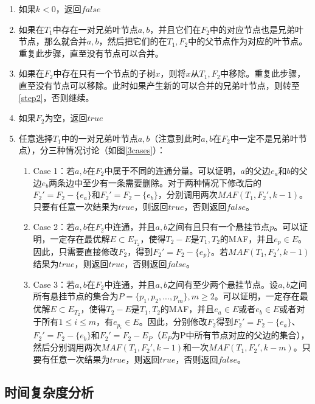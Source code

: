 \begin{enumerate}
	\item 如果$k<0$，返回$false$
	\item \label{step2}如果在$T_1$中存在一对兄弟叶节点$a,b$，并且它们在$F_2$中的对应节点也是兄弟叶节点，那么就合并$a,b$，然后把它们的在$T_1,F_2$中的父节点作为对应的叶节点。重复此步骤，直至没有节点可以合并。
	\item 如果在$F_2$中存在只有一个节点的子树$x$，则将$x$从$T_1,F_2$中移除。重复此步骤，直至没有节点可以移除。此时如果产生新的可以合并的兄弟叶节点，则转至\ref{step2}，否则继续。
	\item 如果$F_2$为空，返回$true$
	\item \label{step5}任意选择$T_1$中的一对兄弟叶节点$a,b$（注意到此时$a,b$在$F_2$中一定不是兄弟叶节点），分三种情况讨论（如图\ref{3cases}）：
	\begin{enumerate}
		\item Case 1\label{case1}：若$a,b$在$F_2$中属于不同的连通分量。可以证明，$a$的父边$e_a$和$b$的父边$e_b$两条边中至少有一条需要删除。对于两种情况下修改后的$F_2' = F_2 - \{e_a\}$和$F_2' = F_2 - \{e_b\}$，分别调用两次$MAF(T_1,F_2',k-1)$。只要有任意一次结果为$true$，则返回$true$，否则返回$false$。
		\item Case 2\label{case2}：若$a,b$在$F_2$中连通，并且$a,b$之间有且只有一个悬挂节点$p$。可以证明，一定存在最优解$E \subset E_{T_2}$，使得$T_2 - E$是$T_1,T_2$的MAF，并且$e_p \in E$。因此，只需要直接修改$F_2$，得到$F_2' = F_2-\{e_p\}$。若$MAF(T_1,F_2',k-1)$结果为$true$，则返回$true$，否则返回$false$。
		\item Case 3\label{case3}：若$a,b$在$F_2$中连通，并且$a,b$之间有至少两个悬挂节点。设$a,b$之间所有悬挂节点的集合为$P=\{p_1,p_2,...,p_m\},m \ge 2$。可以证明，一定存在最优解$E \subset E_{T_2}$，使得$T_2 - E$是$T_1,T_2$的MAF，并且$e_a \in E$或者$e_b \in E$或者对于所有$1 \le i \le m$，有$e_{p_i} \in E$。因此，分别修改$F_2$得到$F_2' = F_2 - \{e_a\}$、$F_2' = F_2 - \{e_b\}$和$F_2' = F_2 - E_P$（$E_P$为P中所有节点对应的父边的集合），然后分别调用两次$MAF(T_1,F_2',k-1)$和一次$MAF(T_1,F_2',k-m)$。只要有任意一次结果为$true$，则返回$true$，否则返回$false$。
	\end{enumerate}  
\end{enumerate}

\subsection{时间复杂度分析}

